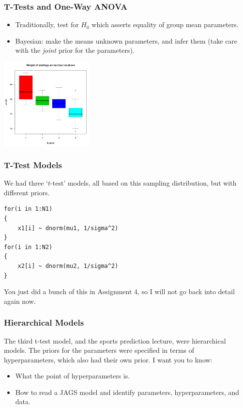 \documentclass{beamer}
\begin{document}
\begin{frame}
\frametitle{T-Tests and One-Way ANOVA}

\begin{itemize}
\item Traditionally, test for $H_0$ which asserts equality of group mean parameters.\pause
\item Bayesian: make the means unknown parameters, and infer them (take care
with the {\em joint} prior for the parameters).\pause
\end{itemize}

\centering
\includegraphics[width=0.35\textwidth]{images/starling.png}

\end{frame}

\begin{frame}[fragile]
\frametitle{T-Test Models}
We had three `$t$-test' models, all based on this sampling distribution,
but with different priors.
{
\footnotesize
\begin{verbatim}
for(i in 1:N1)
{
    x1[i] ~ dnorm(mu1, 1/sigma^2)
}
for(i in 1:N2)
{
    x2[i] ~ dnorm(mu2, 1/sigma^2)
}
\end{verbatim}
}
You just did a bunch of this in Assignment 4, so I will not go back into detail
again now.
\end{frame}


\begin{frame}[fragile]
\frametitle{Hierarchical Models}
The third t-test model, and the sports prediction lecture, were hierarchical
models. The priors for the parameters were specified in terms of hyperparameters,
which also had their own prior. I want you to know:

\begin{itemize}
\item What the point of hyperparameters is.\pause
\item How to read a JAGS model and identify parameters, hyperparameters, and
data.
\end{itemize}

\end{frame}
\end{document}

